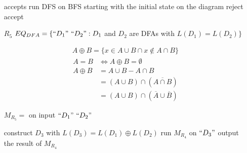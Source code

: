 \begin{enumerate}
\begin{algorithm}[H]
\begin{algorithmic}
                \State accepts
            \Else
                \State run DFS on BFS starting with the initial state on the diagram
                    \State reject
                \Else
                    \State accept
                \EndIf
            \EndIf
        \end{algorithmic}
    \end{algorithm}
    \item [$R_5$] $EQ_{DFA}=\{ ``D_1"\ ``D_2": D_1$ and $D_2$ are DFAs with $L(D_1)=L(D_2) \}$
    \begin{definition}
        \begin{align*}
            A \oplus B = \{ x\in A\cup B \cap x \notin A\cap B \}
        \end{align*}
        \begin{align*}
            A=B &\iff A\oplus B=\emptyset\\
            A\oplus B&=A\cup B-A\cap B\\
            &= (A\cup B)\cap (\overline{A\cap B})\\
            &=(A\cup B)\cap (\overline{A}\cup \overline{B})
        \end{align*}
    \end{definition}
    \subitem $M_{R_5}=$ on input $``D_1"\ ``D_2"$

    \begin{algorithm}[H]
        \caption{$M_{R_5}$}
        \begin{algorithmic}
            \State construct $D_3$ with $L(D_3)=L(D_1)\oplus L(D_2)$
            \State run $M_{R_4}$ on $``D_3"$
            \State output the result of $M_{R_4}$
        \end{algorithmic}
    \end{algorithm}
\end{enumerate}

